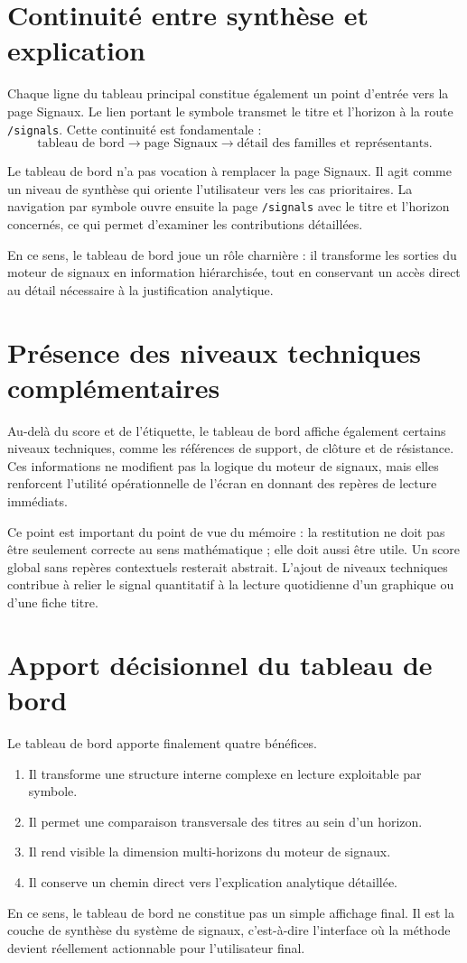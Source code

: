 \section{Continuité entre synthèse et explication}
Chaque ligne du tableau principal constitue également un point d'entrée vers la
page Signaux. Le lien portant le symbole transmet le titre et l'horizon à la
route \texttt{/signals}. Cette continuité est fondamentale :
\[
\text{tableau de bord} \rightarrow \text{page Signaux} \rightarrow \text{détail des familles et représentants}.
\]

Le tableau de bord n'a pas vocation à remplacer la page Signaux. Il agit comme
un niveau de synthèse qui oriente l'utilisateur vers les cas prioritaires. La
navigation par symbole ouvre ensuite la page \texttt{/signals} avec le titre et
l'horizon concernés, ce qui permet d'examiner les contributions détaillées.

En ce sens, le tableau de bord joue un rôle charnière : il transforme les
sorties du moteur de signaux en information hiérarchisée, tout en conservant un
accès direct au détail nécessaire à la justification analytique.

\section{Présence des niveaux techniques complémentaires}
Au-delà du score et de l'étiquette, le tableau de bord affiche également certains
niveaux techniques, comme les références de support, de clôture et de résistance.
Ces informations ne modifient pas la logique du moteur de signaux, mais elles
renforcent l'utilité opérationnelle de l'écran en donnant des repères de lecture
immédiats.

Ce point est important du point de vue du mémoire : la restitution ne doit pas
être seulement correcte au sens mathématique ; elle doit aussi être utile. Un
score global sans repères contextuels resterait abstrait. L'ajout de niveaux
techniques contribue à relier le signal quantitatif à la lecture quotidienne d'un
graphique ou d'une fiche titre.

\section{Apport décisionnel du tableau de bord}
Le tableau de bord apporte finalement quatre bénéfices.
\begin{enumerate}
\item Il transforme une structure interne complexe en lecture exploitable par
symbole.
\item Il permet une comparaison transversale des titres au sein d'un horizon.
\item Il rend visible la dimension multi-horizons du moteur de signaux.
\item Il conserve un chemin direct vers l'explication analytique détaillée.
\end{enumerate}

En ce sens, le tableau de bord ne constitue pas un simple affichage final. Il est
la couche de synthèse du système de signaux, c'est-à-dire l'interface où la
méthode devient réellement actionnable pour l'utilisateur final.
